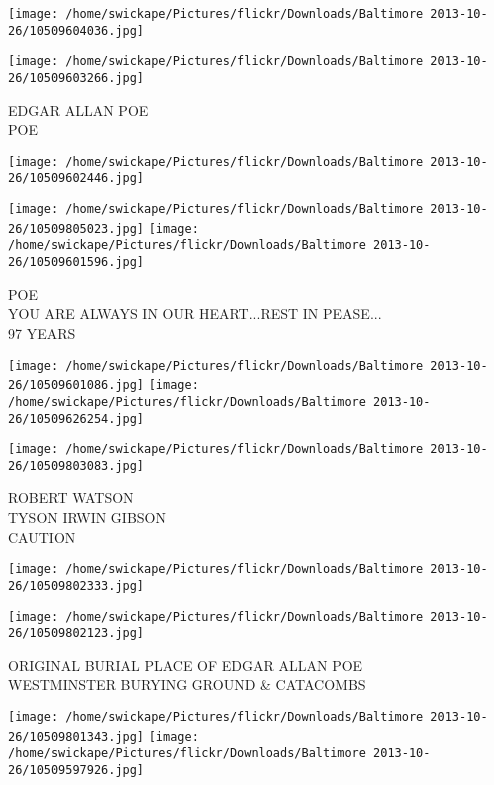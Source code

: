 \documentclass[10pt,letterpaper]{article}
\begin{document}
\texttt{[image: /home/swickape/Pictures/flickr/Downloads/Baltimore 2013-10-26/10509604036.jpg]}

\vspace{0.25in}
\texttt{[image: /home/swickape/Pictures/flickr/Downloads/Baltimore 2013-10-26/10509603266.jpg]}

EDGAR ALLAN POE\\
POE\\
\pagebreak

\texttt{[image: /home/swickape/Pictures/flickr/Downloads/Baltimore 2013-10-26/10509602446.jpg]}

\vspace{0.25in}
\texttt{[image: /home/swickape/Pictures/flickr/Downloads/Baltimore 2013-10-26/10509805023.jpg]}
\texttt{[image: /home/swickape/Pictures/flickr/Downloads/Baltimore 2013-10-26/10509601596.jpg]}

POE\\
YOU ARE ALWAYS IN OUR HEART...REST IN PEASE...\\
97 YEARS\\
\pagebreak

\texttt{[image: /home/swickape/Pictures/flickr/Downloads/Baltimore 2013-10-26/10509601086.jpg]}
\texttt{[image: /home/swickape/Pictures/flickr/Downloads/Baltimore 2013-10-26/10509626254.jpg]}

\vspace{0.25in}
\texttt{[image: /home/swickape/Pictures/flickr/Downloads/Baltimore 2013-10-26/10509803083.jpg]}

ROBERT WATSON\\
TYSON IRWIN GIBSON\\
CAUTION\\
\pagebreak

\texttt{[image: /home/swickape/Pictures/flickr/Downloads/Baltimore 2013-10-26/10509802333.jpg]}

\vspace{0.25in}
\texttt{[image: /home/swickape/Pictures/flickr/Downloads/Baltimore 2013-10-26/10509802123.jpg]}

ORIGINAL BURIAL PLACE OF EDGAR ALLAN POE\\
WESTMINSTER BURYING GROUND \& CATACOMBS\\
\pagebreak

\texttt{[image: /home/swickape/Pictures/flickr/Downloads/Baltimore 2013-10-26/10509801343.jpg]}
\texttt{[image: /home/swickape/Pictures/flickr/Downloads/Baltimore 2013-10-26/10509597926.jpg]}
\end{document}
